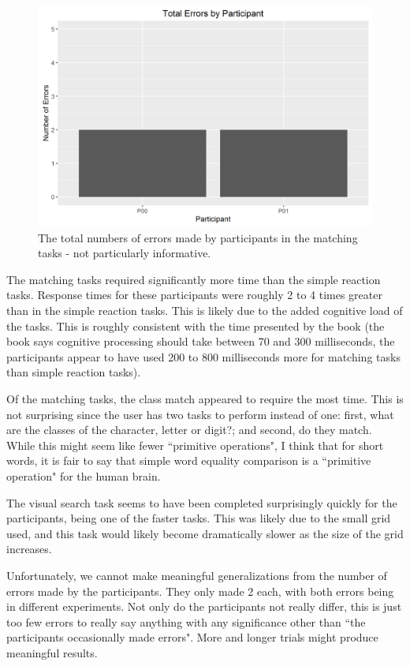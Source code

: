 \documentclass{article}
\begin{document}
\begin{figure}[h!]
\centering
\includegraphics[width=.5\linewidth]{matching-errors}
\caption{The total numbers of errors made by participants in the matching tasks - not particularly informative.}
\label{fig:matching-errors}
\end{figure}

The matching tasks required significantly more time than the simple reaction tasks. Response times for these participants were roughly 2 to 4 times greater than in the simple reaction tasks. This is likely due to the added cognitive load of the tasks. This is roughly consistent with the time presented by the book (the book says cognitive processing should take between 70 and 300 milliseconds, the participants appear to have used 200 to 800 milliseconds more for matching tasks than simple reaction tasks).

Of the matching tasks, the class match appeared to require the most time. This is not surprising since the user has two tasks to perform instead of one: first, what are the classes of the character, letter or digit?; and second, do they match. While this might seem like fewer ``primitive operations", I think that for short words, it is fair to say that simple word equality comparison is a ``primitive operation" for the human brain.

The visual search task seems to have been completed surprisingly quickly for the participants, being one of the faster tasks. This was likely due to the small grid used, and this task would likely become dramatically slower as the size of the grid increases.

Unfortunately, we cannot make meaningful generalizations from the number of errors made by the participants. They only made 2 each, with both errors being in different experiments. Not only do the participants not really differ, this is just too few errors to really say anything with any significance other than ``the participants occasionally made errors". More and longer trials might produce meaningful results.

%
\end{document}

